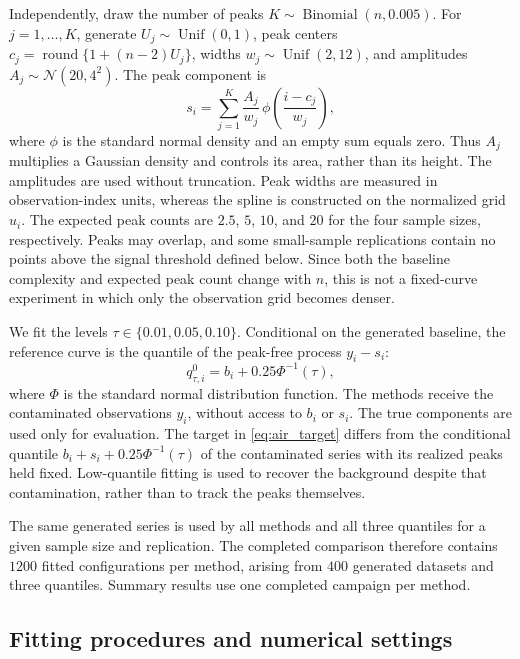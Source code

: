 Independently, draw the number of peaks $K\sim\operatorname{Binomial}(n,0.005)$. For $j=1,\ldots,K$, generate $U_j\sim\operatorname{Unif}(0,1)$, peak centers $c_j=\operatorname{round}\{1+(n-2)U_j\}$, widths $w_j\sim\operatorname{Unif}(2,12)$, and amplitudes $A_j\sim\mathcal{N}(20,4^2)$. The peak component is
\begin{equation}
 s_i=\sum_{j=1}^{K}\frac{A_j}{w_j}\,
 \phi\!\left(\frac{i-c_j}{w_j}\right),
 \label{eq:air_peaks}
\end{equation}
where $\phi$ is the standard normal density and an empty sum equals zero. Thus $A_j$ multiplies a Gaussian density and controls its area, rather than its height. The amplitudes are used without truncation. Peak widths are measured in observation-index units, whereas the spline is constructed on the normalized grid $u_i$. The expected peak counts are $2.5$, $5$, $10$, and $20$ for the four sample sizes, respectively. Peaks may overlap, and some small-sample replications contain no points above the signal threshold defined below. Since both the baseline complexity and expected peak count change with $n$, this is not a fixed-curve experiment in which only the observation grid becomes denser.

We fit the levels $\tau\in\{0.01,0.05,0.10\}$. Conditional on the generated baseline, the reference curve is the quantile of the peak-free process $y_i-s_i$:
\begin{equation}
 q_{\tau,i}^{0}=b_i+0.25\Phi^{-1}(\tau),
 \label{eq:air_target}
\end{equation}
where $\Phi$ is the standard normal distribution function. The methods receive the contaminated observations $y_i$, without access to $b_i$ or $s_i$. The true components are used only for evaluation. The target in \eqref{eq:air_target} differs from the conditional quantile $b_i+s_i+0.25\Phi^{-1}(\tau)$ of the contaminated series with its realized peaks held fixed. Low-quantile fitting is used to recover the background despite that contamination, rather than to track the peaks themselves.

The same generated series is used by all methods and all three quantiles for a given sample size and replication. The completed comparison therefore contains $1200$ fitted configurations per method, arising from $400$ generated datasets and three quantiles. Summary results use one completed campaign per method.

\subsection{Fitting procedures and numerical settings}
\label{subsec:air_fitting}

